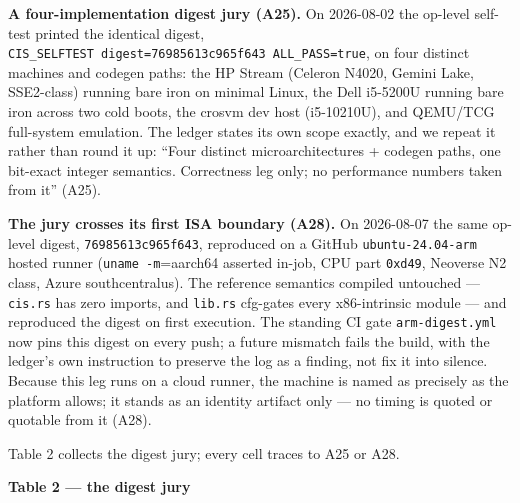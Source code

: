 \documentclass[11pt]{article}
\begin{document}
\textbf{A four-implementation digest jury (A25).} On 2026-08-02 the op-level self-test printed the
identical digest, \texttt{CIS\_SELFTEST\ digest=76985613c965f643\ ALL\_PASS=true}, on four distinct machines
and codegen paths: the HP Stream (Celeron N4020, Gemini Lake, SSE2-class) running bare iron on
minimal Linux, the Dell i5-5200U running bare iron across two cold boots, the crosvm dev host
(i5-10210U), and QEMU/TCG full-system emulation. The ledger states its own scope exactly, and we
repeat it rather than round it up: ``Four distinct microarchitectures + codegen paths, one
bit-exact integer semantics. Correctness leg only; no performance numbers taken from it'' (A25).

\textbf{The jury crosses its first ISA boundary (A28).} On 2026-08-07 the same op-level digest,
\texttt{76985613c965f643}, reproduced on a GitHub \texttt{ubuntu-24.04-arm} hosted runner (\texttt{uname\ -m}=aarch64
asserted in-job, CPU part \texttt{0xd49}, Neoverse N2 class, Azure southcentralus). The reference
semantics compiled untouched --- \texttt{cis.rs} has zero imports, and \texttt{lib.rs} cfg-gates every
x86-intrinsic module --- and reproduced the digest on first execution. The standing CI gate
\texttt{arm-digest.yml} now pins this digest on every push; a future mismatch fails the build, with the
ledger's own instruction to preserve the log as a finding, not fix it into silence. Because this
leg runs on a cloud runner, the machine is named as precisely as the platform allows; it stands
as an identity artifact only --- no timing is quoted or quotable from it (A28).

Table 2 collects the digest jury; every cell traces to A25 or A28.

\textbf{Table 2 --- the digest jury}
\end{document}
